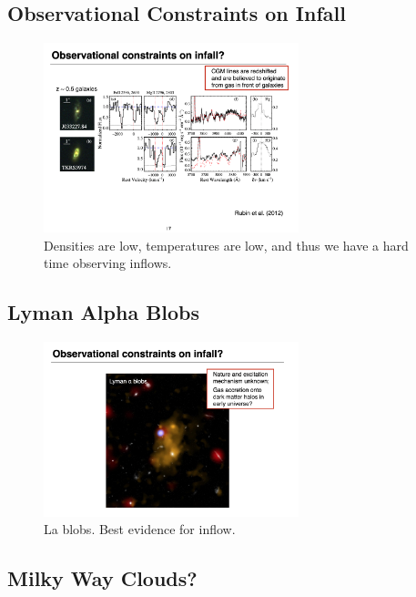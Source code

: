\documentclass{article}
\begin{document}
\subsection{Observational Constraints on Infall}

\begin{figure}
    \centering
    \includegraphics[width=0.66\textwidth]{figs/Screen Shot 2021-10-08 at 10.54.33 AM.png}
    \caption{Densities are low, temperatures are low, and thus we have a hard time observing inflows. }
    \label{fig:inflow_constraints}
\end{figure}

\subsection{Lyman Alpha Blobs}

\begin{figure}
    \centering
    \includegraphics[width=0.66\textwidth]{figs/Screen Shot 2021-10-08 at 10.58.30 AM.png}
    \caption{La blobs. Best evidence for inflow.}
    \label{fig:Lymanalpha_blobs}
\end{figure}

\subsection{Milky Way Clouds?}
\end{document}
